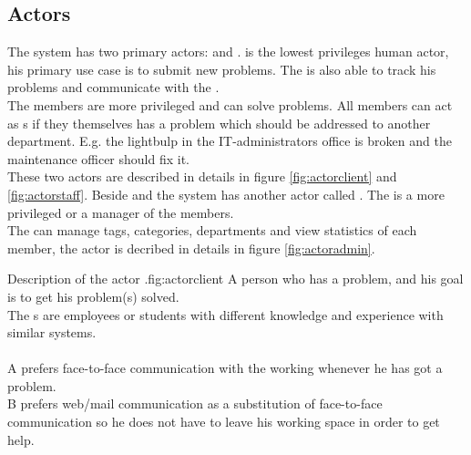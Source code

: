 \subsection{Actors}
\label{sec:actors}

The system has two primary actors:   \aclient{} and \astaff. \aclient[c] is the lowest privileges human actor, his primary use case is to submit new problems. The \aclient[] is also able to track his problems and communicate with the \astaff[]. \\

The \astaff{} members are more privileged and can solve problems. 
All \astaff{} members can act as \aclient{}s if they themselves has a problem which should be addressed to another department. 
E.g. the lightbulp in the IT-administrators office is broken and the maintenance officer should fix it. \\

These two actors are described in details in figure \ref{fig:actorclient} and \ref{fig:actorstaff}. 
Beside \astaff{} and \aclient{} the system has another actor called \sadmin{}. 
The \sadmin{} is a more privileged \astaff{} or a manager of the \astaff members. \\

The \sadmin{} can manage tags, categories, departments and view statistics of each \astaff member, the actor \admin[] is decribed in details in figure \ref{fig:actoradmin}.

\begin{sadlist}[h]{\Aclient}{Description of the actor \aclient.}{fig:actorclient}
 A person who has a problem, and his goal is to get his problem(s) solved. \\
 The \aclient{}s are employees or students with different knowledge and experience with similar systems. \\%
\\ \Aclient{} A prefers face-to-face communication with the working \astaff{} whenever he has got a problem.\\
\aclient[c] B prefers web/mail communication as a substitution of face-to-face communication so he does not have to leave his working space in order to get help. 
\end{sadlist} 


